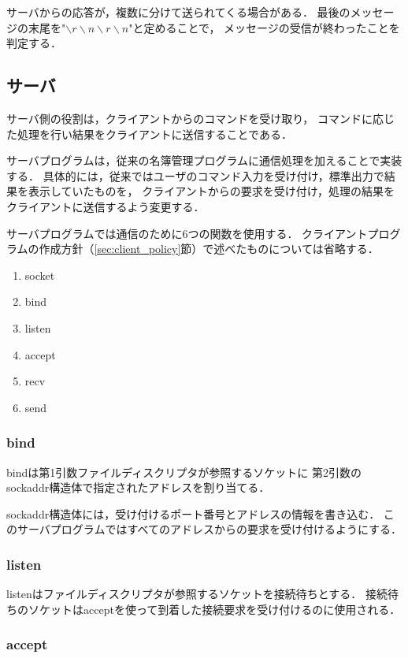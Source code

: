 \documentclass[11pt]{jarticle}
\begin{document}
サーバからの応答が，複数に分けて送られてくる場合がある．
最後のメッセージの末尾を"$\backslash r\backslash n\backslash r\backslash n$"と定めることで，
メッセージの受信が終わったことを判定する．

\subsection{サーバ}

サーバ側の役割は，クライアントからのコマンドを受け取り，
コマンドに応じた処理を行い結果をクライアントに送信することである．

サーバプログラムは，従来の名簿管理プログラムに通信処理を加えることで実装する．
具体的には，従来ではユーザのコマンド入力を受け付け，標準出力で結果を表示していたものを，
クライアントからの要求を受け付け，処理の結果をクライアントに送信するよう変更する．

サーバプログラムでは通信のために6つの関数を使用する．
クライアントプログラムの作成方針（\ref{sec:client_policy}節）で述べたものについては省略する．

\begin{enumerate}
    \item socket
    \item bind
    \item listen
    \item accept
    \item recv
    \item send
\end{enumerate}

\subsubsection{bind}

bindは第1引数ファイルディスクリプタが参照するソケットに
第2引数のsockaddr構造体で指定されたアドレスを割り当てる．

sockaddr構造体には，受け付けるポート番号とアドレスの情報を書き込む．
このサーバプログラムではすべてのアドレスからの要求を受け付けるようにする．

\subsubsection{listen}

listenはファイルディスクリプタが参照するソケットを接続待ちとする．
接続待ちのソケットはacceptを使って到着した接続要求を受け付けるのに使用される．

\subsubsection{accept}
\end{document}
